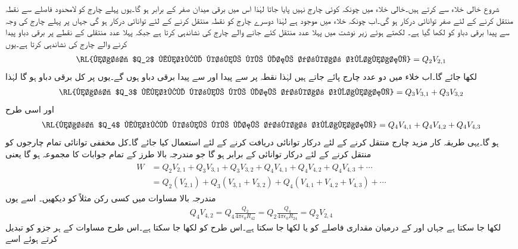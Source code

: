 شروع خالی خلاء سے کرتے ہیں۔خالی خلاء میں چونکہ کوئی چارج نہیں پایا جاتا لہٰذا اس میں برقی میدان صفر کے برابر ہو گا۔یوں پہلے چارج  کو لامحدود فاصلے سے  نقطہ  منتقل کرنے کے لئے صفر توانائی درکار ہو گی۔اب چونکہ خلاء میں  موجود ہے لہٰذا دوسرے چارج  کو  نقطہ  منتقل کرنے کے لئے  توانائی درکار ہو گی جہاں  پر پہلے چارج کی وجہ سے پیدا برقی دباو کو  لکھا گیا ہے۔ لکھتے ہوئے زیر نوشت میں پہلا عدد منتقل کئے جانے والے چارج کی نشاندہی کرتا ہے جبکہ پہلا عدد  منتقلی کے نقطے پر برقی دباو پیدا کرنے والے چارج کی نشاندہی کرتا ہے۔یوں
\begin{align*}
\textup{\RL{چارج $Q_2$ منتقل کرنے کے لئے درکار توانائی}}=Q_2 V_{2,1}
\end{align*}
لکھا جائے گا۔اب خلاء میں دو عدد چارج پائے جاتے ہیں لہٰذا  نقطہ  پر  سے پیدا  اور  سے پیدا  برقی دباو ہوں گے۔یوں  پر کل  برقی دباو ہو گا لہٰذا
\begin{align*}
\textup{\RL{چارج $Q_3$ منتقل کرنے کے لئے درکار توانائی}}=Q_3 V_{3,1} +Q_3 V_{3,2}
\end{align*}
اور اسی طرح
\begin{align*}
\textup{\RL{چارج $Q_4$ منتقل کرنے کے لئے درکار توانائی}}=Q_4 V_{4,1} +Q_4 V_{4,2}+Q_4 V_{4,3}
\end{align*}
ہو گا۔یہی طریقہ کار مزید چارج منتقل کرنے کے لئے درکار توانائی دریافت کرنے کے لئے استعمال کیا جائے گا۔کل مخففی توانائی  تمام چارجوں کو منتقل کرنے کے لئے درکار توانائی کے برابر ہو گا جو مندرجہ بالا طرز کے تمام جوابات کا مجموعہ ہو گا یعنی
\begin{gather}
\begin{aligned}\label{مساوات_توانائی_چارج_کثافت_توانائی_الف}
W&=Q_2 V_{2,1}+Q_3 V_{3,1} +Q_3 V_{3,2}+Q_4 V_{4,1} +Q_4 V_{4,2}+Q_4 V_{4,3}+\cdots\\
&=Q_2(V_{2,1})+Q_3( V_{3,1}+V_{3,2})+Q_4(V_{4,1} +V_{4,2}+V_{4,3})+\cdots
\end{aligned}
\end{gather}
مندرجہ بالا مساوات میں کسی رکن مثلاً  کو دیکھیں۔ اسے یوں
\begin{align*}
Q_4 V_{4,2} = Q_4 \frac{Q_2}{4\pi \epsilon_0 R_{42}}= Q_2 \frac{Q_4}{4\pi \epsilon_0 R_{24}}= Q_2 V_{2,4}
\end{align*}
 لکھا جا سکتا ہے جہاں  اور  کے درمیان مقداری فاصلے کو  یا  لکھا جا سکتا ہے۔اس طرح  کو  لکھا جا سکتا ہے۔اس طرح مساوات  کے ہر جزو کو تبدیل کرتے ہوئے اسے
